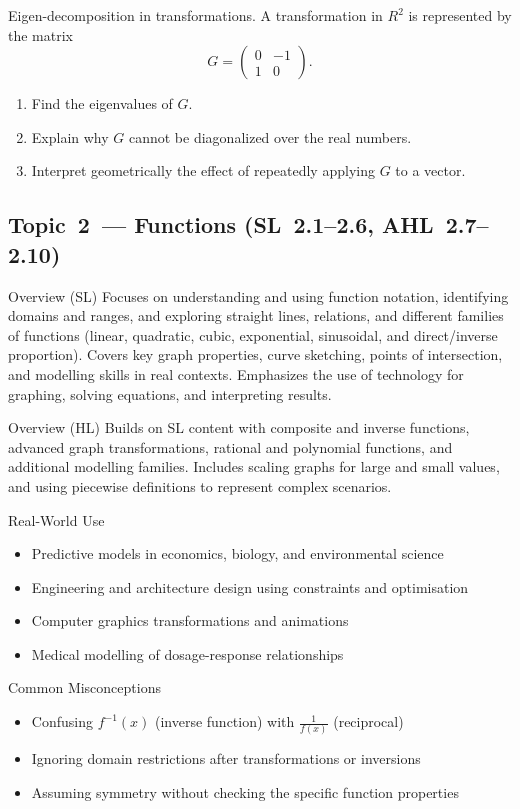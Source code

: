 \documentclass[11pt]{article}
\def\textbf#1{#1}%
\def\mathbb#1{#1}%
\newcommand{\tocsubsection}[1]{\subsection{#1}}
\newcounter{question}
\begin{document}
\begin{question}
\textbf{Eigen-decomposition in transformations.}
A transformation in $\mathbb{R}^2$ is represented by the matrix
\[
G = \begin{pmatrix} 0 & -1 \\ 1 & 0 \end{pmatrix}.
\]
\begin{enumerate}
    \item Find the eigenvalues of $G$.
    \item Explain why $G$ cannot be diagonalized over the real numbers.
    \item Interpret geometrically the effect of repeatedly applying $G$ to a vector.
\end{enumerate}
\end{question}


\tocsubsection{Topic 2 — Functions (SL 2.1–2.6, AHL 2.7–2.10)}
\textbf{Overview (SL)}  
Focuses on understanding and using function notation, identifying domains and ranges, and exploring straight lines, relations, and different families of functions (linear, quadratic, cubic, exponential, sinusoidal, and direct/inverse proportion). Covers key graph properties, curve sketching, points of intersection, and modelling skills in real contexts. Emphasizes the use of technology for graphing, solving equations, and interpreting results.

\textbf{Overview (HL)}  
Builds on SL content with composite and inverse functions, advanced graph transformations, rational and polynomial functions, and additional modelling families. Includes scaling graphs for large and small values, and using piecewise definitions to represent complex scenarios.

\textbf{Real-World Use}  
\begin{itemize}
  \item Predictive models in economics, biology, and environmental science
  \item Engineering and architecture design using constraints and optimisation
  \item Computer graphics transformations and animations
  \item Medical modelling of dosage-response relationships
\end{itemize}

\textbf{Common Misconceptions}  
\begin{itemize}
  \item Confusing $f^{-1}(x)$ (inverse function) with $\frac{1}{f(x)}$ (reciprocal)
  \item Ignoring domain restrictions after transformations or inversions
  \item Assuming symmetry without checking the specific function properties
\end{itemize}
\end{document}
